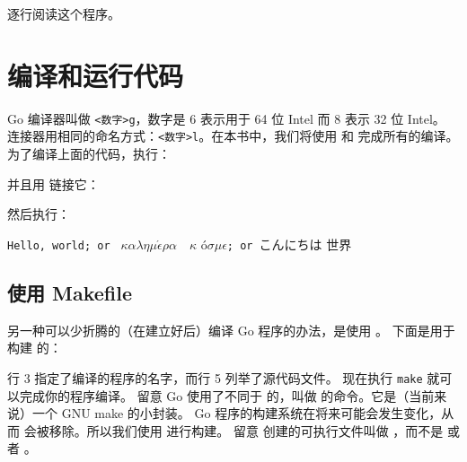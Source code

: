 
逐行阅读这个程序。
\showremarks

\section{编译和运行代码}
Go 编译器叫做 \verb|<数字>g|，数字是 6 表示用于 64 位 Intel 而 8 表示 32 位 Intel。
连接器用相同的命名方式：\verb|<数字>l|。在本书中，我们将使用  和  完成所有的编译。
为了编译上面的代码，执行：
\begin{display}
\pr {}
\end{display}

\noindent{}并且用  链接它：

\begin{display}
\pr {}
\end{display}

\noindent{}然后执行：
\begin{display}
\pr {}	    
\end{display}
\vspace{-3.0ex}
\texttt{Hello, world; or }%
\begin{math}\kappa\alpha\lambda\eta\mu\acute{\epsilon}\rho\alpha\hspace{1em}\kappa\end{math}%
\'o\begin{math} \sigma\mu\epsilon\end{math}\texttt{; or }こんにちは 世界
\ \newline
\ \newline

\subsection{使用 Makefile}
\label{sec:building a program}
另一种可以少折腾的（在建立好后）编译 Go 程序的办法，是使用 。
下面是用于构建 的：

行 3 指定了编译的程序的名字，而行 5 列举了源代码文件。
现在执行 \verb|make| 就可以完成你的程序编译。
留意 Go 使用了不同于  的，叫做  的命令。它是（当前来说）一个 GNU make 的小封装。
Go 程序的构建系统在将来可能会发生变化，从而  会被移除。所以我们使用  进行构建。
留意  创建的可执行文件叫做 ，而不是  或者 。

